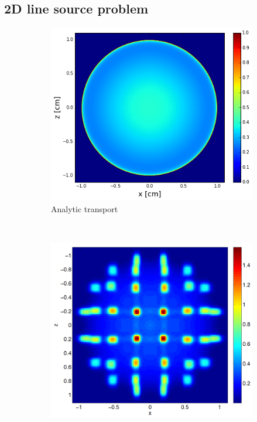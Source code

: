 \documentclass[review]{elsarticle}
\begin{document}
\subsection{2D line source problem}
\begin{figure}[ht!]
	\begin{subfigure}{.5\textwidth}
		\centering
		\hspace*{-1cm}\includegraphics[width=1.\linewidth]{linesrc-ref.png}
		\caption{Analytic transport}
		\label{f:trans}
	\end{subfigure}
	~
	\begin{subfigure}{.5\textwidth}
		\centering
		\includegraphics[width=1.\linewidth]{line-s8}

\end{subfigure}
\end{figure}
\end{document}

